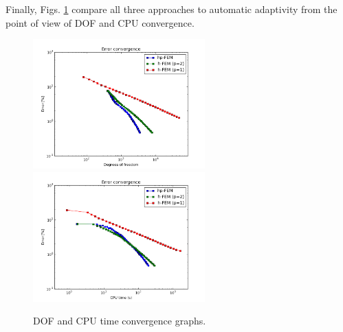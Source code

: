 Finally, Figs. \ref{fig:nist-11-conv} compare all
three approaches to automatic adaptivity from the point
of view of DOF and CPU convergence.

\begin{figure}[!ht]
\centering
\includegraphics[height=5cm]{nist/nist-11/conv_dof_aniso.png}\ \
\includegraphics[height=5cm]{nist/nist-11/conv_cpu_aniso.png}
\caption{DOF and CPU time convergence graphs.}
\label{fig:nist-11-conv}
\end{figure}

